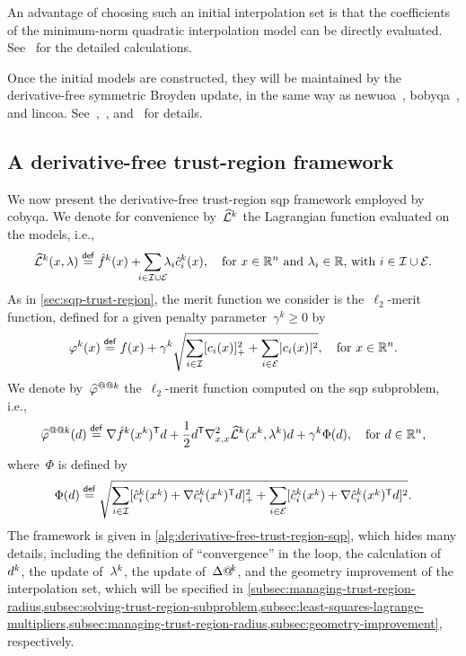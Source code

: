 An advantage of choosing such an initial interpolation set is that the coefficients of the minimum-norm quadratic interpolation model can be directly evaluated.
See~\cite[\S~9]{Powell_2009} for the detailed calculations.

Once the initial models are constructed, they will be maintained by the derivative-free symmetric Broyden update, in the same way as \gls{newuoa}~\cite{Powell_2006}, \gls{bobyqa}~\cite{Powell_2009}, and \gls{lincoa}.
See~\cite{Powell_2004b,Powell_2004c},~\cite[\S~4]{Powell_2006}, and~\cite[\S~4]{Powell_2009} for details.

\subsection{A derivative-free trust-region  framework}
\label{subsec:cobyqa-framework}

We now present the derivative-free trust-region \gls{sqp} framework employed by \gls{cobyqa}.
We denote for convenience by~$\lagm[k]$ the Lagrangian function evaluated on the models, i.e.,
\begin{equation*}
    \lagm[k](\iter, \lm) \eqdef \objm[k](\iter) + \sum_{\mathclap{i \in \iub \cup \ieq}} \lm_i \conm[k]{i}(\iter), \quad \text{for~$\iter \in \R^n$ and~$\lm_i \in \R$, with~$i \in \iub \cup \ieq$.}
\end{equation*}
As in \cref{sec:sqp-trust-region}, the merit function we consider is the~$\ell_2$-merit function, defined for a given penalty parameter~$\gamma^k \ge 0$ by
\begin{equation*}
    \merit[k](\iter) \eqdef \obj(x) + \gamma^k \sqrt{\sum_{i \in \iub} \posp{\con{i}(\iter)}^2 + \sum_{i \in \ieq} \abs{\con{i}(\iter)}^2}, \quad \text{for~$\iter \in \R^n$.}
\end{equation*}
We denote by~$\meritm[k]$ the~$\ell_2$-merit function computed on the \gls{sqp} subproblem, i.e.,
\begin{equation}
    \label{eq:l2-merit-function-model}
    \meritm[k](\step) \eqdef \nabla \objm[k](\iter[k])^{\T} \step + \frac{1}{2} \step^{\T} \nabla_{x, x}^2 \lagm[k](\iter[k], \lm[k]) \step + \gamma^k \Phi(\step), \quad \text{for~$\step \in \R^n$,}
\end{equation}
where~$\Phi$ is defined by
\begin{equation}
    \label{eq:l2-merit-function-model-penalty}
    \Phi(d) \eqdef \sqrt{\sum_{i \in \iub} \posp{\conm[k]{i}(\iter[k]) + \nabla \conm[k]{i}(\iter[k])^{\T} \step}^2 + \sum_{i \in \ieq} [\conm[k]{i}(\iter[k]) + \nabla \conm[k]{i}(\iter[k])^{\T} \step]^2}.
\end{equation}
The framework is given in \cref{alg:derivative-free-trust-region-sqp}, which hides many details, including the definition of \enquote{convergence} in the loop, the calculation of~$\step[k]$, the update of~$\lm[k]$, the update of~$\rad[k]$, and the geometry improvement of the interpolation set, which will be specified in \cref{subsec:managing-trust-region-radius,subsec:solving-trust-region-subproblem,subsec:least-squares-lagrange-multipliers,subsec:managing-trust-region-radius,subsec:geometry-improvement}, respectively.

